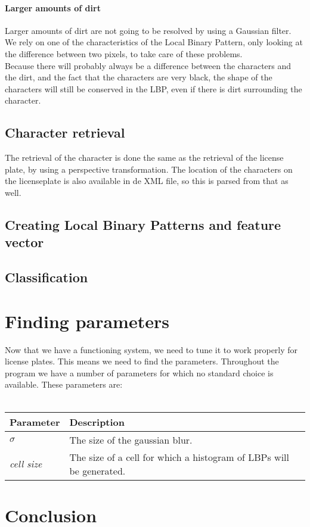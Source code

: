 \documentclass[a4paper]{article}
\begin{document}
\paragraph*{Larger amounts of dirt}

Larger amounts of dirt are not going to be resolved by using a Gaussian filter.
We rely on one of the characteristics of the Local Binary Pattern, only looking at
the difference between two pixels, to take care of these problems.\\
Because there will probably always be a difference between the characters and the 
dirt, and the fact that the characters are very black, the shape of the characters
will still be conserved in the LBP, even if there is dirt surrounding the character.

\subsection*{Character retrieval}

The retrieval of the character is done the same as the retrieval of the license
plate, by using a perspective transformation. The location of the characters on the
licenseplate is also available in de XML file, so this is parsed from that as well.

\subsection*{Creating Local Binary Patterns and feature vector}



\subsection*{Classification}



\section{Finding parameters}

Now that we have a functioning system, we need to tune it to work properly for
license plates. This means we need to find the parameters. Throughout the program
we have a number of parameters for which no standard choice is available. These
parameters are:\\
\\
\begin{tabular}{l|l}
	Parameter 			& Description\\
	\hline
	$\sigma$  			& The size of the gaussian blur.\\
	\emph{cell size}	& The size of a cell for which a histogram of LBPs will be generated.

\end{tabular}

\section{Conclusion}
\end{document}
